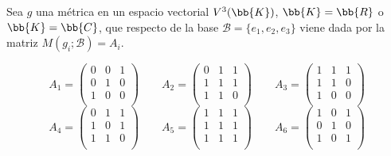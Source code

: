\begin{ejercicio}
    Sea $g$ una métrica en un espacio vectorial $V^3(\bb{K})$, $\bb{K}=\bb{R}$ o $\bb{K} = \bb{C}$, que respecto de la base $\mathcal{B}=\{e_1, e_2, e_3\}$ viene dada por la matriz $M(g_i; \mathcal{B})=A_i$.

    \begin{equation*}
        A_1 = \left(\begin{array}{ccc}
            0 & 0 & 1 \\
            0 & 1 & 0 \\
            1 & 0 & 0 \\
        \end{array} \right) \qquad
        A_2 = \left(\begin{array}{ccc}
            0 & 1 & 1 \\
            1 & 1 & 1 \\
            1 & 1 & 0 \\
        \end{array} \right) \qquad
        A_3 = \left(\begin{array}{ccc}
            1 & 1 & 1 \\
            1 & 1 & 0 \\
            1 & 0 & 0 \\
        \end{array} \right)
    \end{equation*}
    \begin{equation*}
        A_4 = \left(\begin{array}{ccc}
            0 & 1 & 1 \\
            1 & 0 & 1 \\
            1 & 1 & 0 \\
        \end{array} \right) \qquad
        A_5 = \left(\begin{array}{ccc}
            1 & 1 & 1 \\
            1 & 1 & 1 \\
            1 & 1 & 1 \\
        \end{array} \right) \qquad
        A_6 = \left(\begin{array}{ccc}
            1 & 0 & 1 \\
            0 & 1 & 0 \\
            1 & 0 & 1 \\
        \end{array} \right)
    \end{equation*}


\end{ejercicio}
